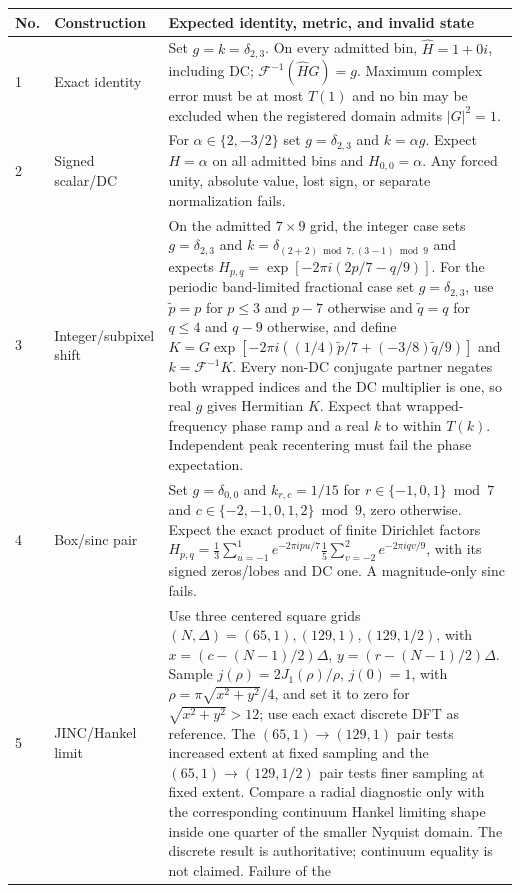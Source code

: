 \documentclass[11pt]{article}
\newcommand{\IFFT}{\mathcal{F}^{-1}}
\begin{document}
\begin{longtable}{@{}L{0.05\textwidth}L{0.24\textwidth}L{0.62\textwidth}@{}}
\toprule
No. & Construction & Expected identity, metric, and invalid state \\
\midrule
{} & Exact identity & Set $g=k=\delta_{2,3}$.  On every admitted bin,
$\widehat H=1+0i$, including DC; $\IFFT(\widehat H G)=g$.  Maximum complex error
must be at most $T(1)$ and no bin may be excluded when the registered domain
admits $|G|^2=1$. \\
2 & Signed scalar/DC & For $\alpha\in\{2,-3/2\}$ set $g=\delta_{2,3}$ and
$k=\alpha g$.  Expect $H=\alpha$ on all admitted bins and
$H_{0,0}=\alpha$.  Any forced unity, absolute value, lost sign, or separate
normalization fails. \\
3 & Integer/subpixel shift & On the admitted $7\times9$ grid, the integer
case sets $g=\delta_{2,3}$ and $k=\delta_{(2+2)\bmod7,(3-1)\bmod9}$ and expects
$H_{p,q}=\exp[-2\pi i(2p/7-q/9)]$.  For the periodic band-limited fractional
case set $g=\delta_{2,3}$, use
$\widetilde p=p$ for $p\leq3$ and $p-7$ otherwise and
$\widetilde q=q$ for $q\leq4$ and $q-9$ otherwise, and define
$K=G\exp[-2\pi i((1/4)\widetilde p/7+(-3/8)\widetilde q/9)]$ and
$k=\IFFT K$.  Every non-DC conjugate partner negates both wrapped indices and
the DC multiplier is one, so real $g$ gives Hermitian $K$.  Expect that
wrapped-frequency phase ramp and a real $k$ to within $T(k)$.  Independent peak
recentering must fail the phase expectation. \\
4 & Box/sinc pair & Set $g=\delta_{0,0}$ and
$k_{r,c}=1/15$ for $r\in\{-1,0,1\}\bmod7$ and
$c\in\{-2,-1,0,1,2\}\bmod9$, zero otherwise.  Expect the exact product of
finite Dirichlet factors
$H_{p,q}=\frac{1}{3}\sum_{u=-1}^{1}e^{-2\pi ipu/7}
\frac{1}{5}\sum_{v=-2}^{2}e^{-2\pi iqv/9}$, with its signed zeros/lobes and
DC one.  A magnitude-only sinc fails. \\
5 & JINC/Hankel limit & Use three centered square grids
$(N,\Delta)=(65,1),(129,1),(129,1/2)$, with
$x=(c-(N-1)/2)\Delta$, $y=(r-(N-1)/2)\Delta$.  Sample
$j(\rho)=2J_1(\rho)/\rho$, $j(0)=1$, with
$\rho=\pi\sqrt{x^2+y^2}/4$, and set it to zero for
$\sqrt{x^2+y^2}>12$; use each exact discrete DFT as reference.  The
$(65,1)\rightarrow(129,1)$ pair tests increased extent at fixed sampling and
the $(65,1)\rightarrow(129,1/2)$ pair tests finer sampling at fixed extent.
Compare a radial diagnostic only with the corresponding continuum Hankel
limiting shape inside one quarter of the smaller Nyquist domain.  The discrete
result is authoritative; continuum equality is not claimed.  Failure of the

\end{longtable}
\end{document}
